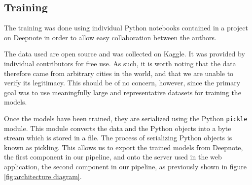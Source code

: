 \subsection{Training}\label{sec:training}
The training was done using individual Python notebooks contained in a project on Deepnote\cite{deepnote} in order to allow easy collaboration between the authors.

The data used are open source and was collected on Kaggle\cite{kaggle}. It was provided by individual contributors for free use.
As such, it is worth noting that the data therefore came from arbitrary cities in the world, and that we are unable to verify its legitimacy.
This should be of no concern, however, since the primary goal was to use meaningfully large and representative datasets for training the models.

Once the models have been trained, they are serialized using the Python \texttt{pickle} module.
This module converts the data and the Python objects into a byte stream which is stored in a file.
The process of serializing Python objects is known as pickling. 
This allows us to export the trained models from Deepnote, the first component in our pipeline, and onto the server used in the web application, the second component in our pipeline, as previously shown in figure \ref{fig:architecture diagram}.\cite{pickle_documentation}